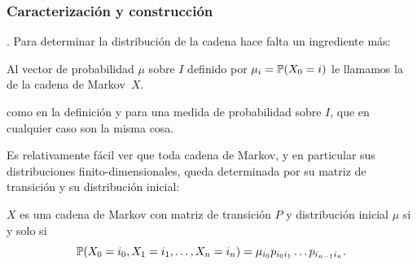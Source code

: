 \subsubsection{Caracterización y construcción}

.
Para determinar la distribución de la cadena hace falta un ingrediente más:

\begin{defn}
Al vector de probabilidad $\mu$ sobre $I$ definido por $\mu_i=\mathbb{P}(X_0=i)$ le llamamos la \emph{} de la cadena de Markov~$X$.
\end{defn}

 como en la definición y para una medida de probabilidad sobre $I$, que en cualquier caso son la misma cosa.

Es relativamente fácil ver que toda cadena de Markov, y en particular sus distribuciones finito-dimensionales, queda determinada por su matriz de transición y su distribución inicial:

\begin{prop}\label{prop:caractMarkov}
$X$ es una cadena de Markov con matriz de transición $P$ y distribución inicial $\mu$ si y solo si
\[\mathbb{P}(X_0=i_0,X_1=i_1,\dotsc,X_n=i_n)=\mu_{i_0}p_{i_0i_1}\dotsc p_{i_{n-1}i_n}.\]
\end{prop}

